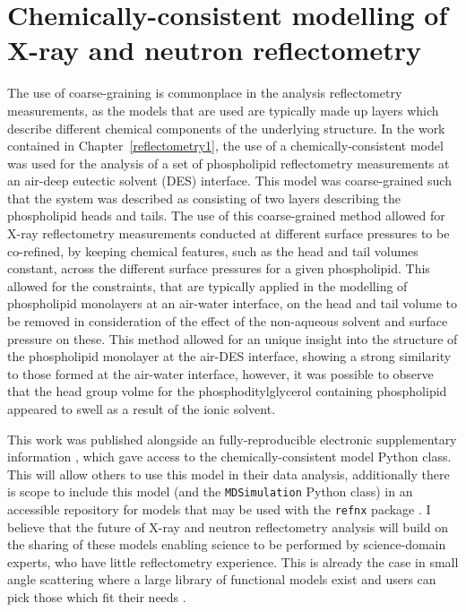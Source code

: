\section{Chemically-consistent modelling of X-ray and neutron reflectometry}
The use of coarse-graining is commonplace in the analysis reflectometry measurements, as the models that are used are typically made up layers which describe different chemical components of the underlying structure.
In the work contained in Chapter~\ref{reflectometry1}, the use of a chemically-consistent model was used for the analysis of a set of phospholipid reflectometry measurements at an air-deep eutectic solvent (DES) interface.
This model was coarse-grained such that the system was described as consisting of two layers describing the phospholipid heads and tails.
The use of this coarse-grained method allowed for X-ray reflectometry measurements conducted at different surface pressures to be co-refined, by keeping chemical features, such as the head and tail volumes constant, across the different surface pressures for a given phospholipid.
This allowed for the constraints, that are typically applied in the modelling of phospholipid monolayers at an air-water interface, on the head and tail volume to be removed in consideration of the effect of the non-aqueous solvent and surface pressure on these.
This method allowed for an unique insight into the structure of the phospholipid monolayer at the air-DES interface, showing a strong similarity to those formed at the air-water interface, however, it was possible to observe that the head group volme for the phosphoditylglycerol containing phospholipid appeared to swell as a result of the ionic solvent.

This work was published alongside an fully-reproducible electronic supplementary information \cite{mccluskey_bayesian_2019,mccluskey_lipids_at_airdes_2019}, which gave access to the chemically-consistent model Python class.
This will allow others to use this model in their data analysis, additionally there is scope to include this model (and the \texttt{MDSimulation} Python class) in an accessible repository for models that may be used with the \texttt{refnx} package \cite{nelson_refnx_2019,nelson_refnx_2019-1,nelson_refnx-models_nodate}.
I believe that the future of X-ray and neutron reflectometry analysis will build on the sharing of these models enabling science to be performed by science-domain experts, who have little reflectometry experience.
This is already the case in small angle scattering where a large library of functional models exist and users can pick those which fit their needs \cite{noauthor_sasfit_nodate,noauthor_sasview_nodate}.

